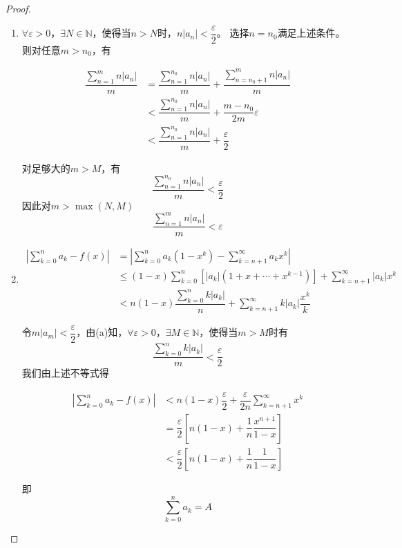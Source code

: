 \begin{proof}

    \begin{enumerate}

        \item 
            $\forall \varepsilon > 0$，$\exists N \in \mathbb{N}$，使得当$n > N$时，$n|a_n| < \dfrac{\varepsilon}{2}$。
            选择$n = n_0$满足上述条件。则对任意$m > n_0$，有
            
            \begin{align*}
                \dfrac{\sum\limits_{n = 1}^{m}{n|a_n|}}{m} & = \dfrac{\sum\limits_{n = 1}^{n_0}{n|a_n|}}{m} + \dfrac{\sum\limits_{n = n_0 + 1}^{m}{n|a_n|}}{m} \\
                & < \dfrac{\sum\limits_{n = 1}^{n_0}{n|a_n|}}{m} + \dfrac{m - n_0}{2m} \varepsilon \\
                & < \dfrac{\sum\limits_{n = 1}^{n_0}{n|a_n|}}{m} + \dfrac{\varepsilon}{2}
            \end{align*}

            对足够大的$m > M$，有
            $$\dfrac{\sum\limits_{n = 1}^{n_0}{n|a_n|}}{m} < \dfrac{\varepsilon}{2}$$
            因此对$m > \max{(N,M)}$
            $$\dfrac{\sum\limits_{n = 1}^{m}{n|a_n|}}{m} < \varepsilon$$

        \item 
            \begin{align*}
                \left| \sum\limits_{k = 0}^{n}{a_k} - f(x) \right| & = \left| \sum\limits_{k = 0}^{n}{a_k(1 - x^k)} - \sum\limits_{k = n + 1}^{\infty}{a_k x^k} \right| \\
                & \leq (1 - x)\sum\limits_{k = 0}^{n}{\left[ |a_k|(1 + x + \cdots + x^{k -1}) \right]} + \sum\limits_{k = n + 1}^{\infty}{|a_k|x^k} \\
                & < n(1 - x)\dfrac{\sum\limits_{k = 0}^{n}{k|a_k|}}{n} + \sum\limits_{k = n + 1}^{\infty}{k|a_k|\dfrac{x^k}{k}}        
            \end{align*}

            令$m|a_m| < \dfrac{\varepsilon}{2}$，由(a)知，$\forall \varepsilon > 0$，$\exists M \in \mathbb{N}$，使得当$m > M$时有 
            $$\dfrac{\sum\limits_{k = 0}^{n}{k|a_k|}}{m} < \dfrac{\varepsilon}{2}$$
            我们由上述不等式得

            \begin{align*}
                \left| \sum\limits_{k = 0}^{n}{a_k} - f(x) \right| & < n(1 - x)\dfrac{\varepsilon}{2} + \dfrac{\varepsilon}{2n}\sum\limits_{k = n + 1}^{\infty}{x^k} \\
                & = \dfrac{\varepsilon}{2}\left[ n(1 - x) + \dfrac{1}{n} \dfrac{x^{n + 1}}{1 - x} \right] \\
                & < \dfrac{\varepsilon}{2}\left[ n(1 - x) + \dfrac{1}{n} \dfrac{1}{1 - x} \right]
            \end{align*}

            即
            $$\sum\limits_{k = 0}^{n}{a_k} = A$$

        \end{enumerate}

\end{proof}

